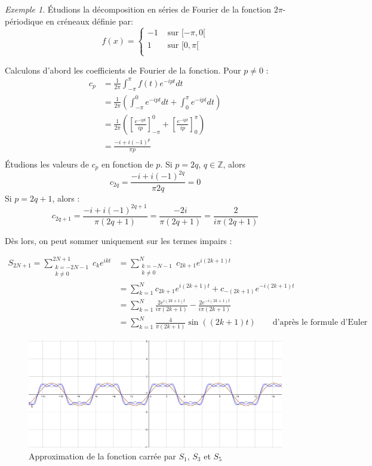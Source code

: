 \documentclass[]{article}
\theoremstyle{remark}
\newtheorem{myexmpl}{Exemple}
\theoremstyle{definition}
\begin{document}
	\begin{myexmpl}
		Étudions la décomposition en séries de Fourier de la fonction $2\pi$-périodique en créneaux définie par: 
		$$ f(x) = \left\{
		\begin{array}{cc}
			-1 & \text{ sur }[-\pi, 0[ \\
			1 & \text{ sur }[0, \pi[ \\
		\end{array}
		\right. $$
	
	Calculons d'abord les coefficients de Fourier de la fonction. 
	Pour $p \neq 0$ : 
	\begin{align*}
	c_p &= \frac{1}{2\pi} \int_{-\pi}^{\pi}f(t)e^{-ipt}dt\\
		&= \frac{1}{2\pi} \left(\int_{-\pi}^{0}e^{-ipt}dt + \int_{0}^{\pi}e^{-i pt}dt\right) \\
		&= \frac{1}{2\pi} \left( \left[\frac{e^{-ipt}}{ip}\right]_{-\pi}^{0}  + \left[\frac{e^{-ipt}}{ip}\right] _{0}^{\pi}  \right)\\
		&=\frac{ -i+i(-1)^p}{\pi p}\\
	\end{align*}
	Étudions les valeurs de $c_p$ en fonction de $p$. Si $p = 2q$, $q \in \mathbb{Z}$, alors 
	$$	c_{2q}= \frac{-i + i(-1)^{2q}}{\pi 2q }= 0 $$
	Si $ p = 2q+1$, alors :
	$$ c_{2q+1} = \frac{-i + i(-1)^{2q+1}}{\pi (2q+1) } = \frac{-2i}{\pi(2q+1)} = \frac{2}{i\pi(2q+1)} $$
	
	Dès lors, on peut sommer uniquement sur les termes impairs : 
	
	\begin{align*}
	S_{2N+1} = \sum_{ \substack{ k = -2N-1\\ k\neq 0} }^{2N+1}c_k e^{ikt} &=   \sum_{\substack{k = -N-1\\k\neq 0}}^{N}c_{2k+1} e^{i(2k+1)t} \\
	&= \sum_{k=1}^{N} c_{2k+1} e^{i(2k+1)t} + c_{-(2k+1)} e^{-i(2k+1)t} \\
	&= \sum_{k=1}^{N} \frac{2e^{i(2k+1)t}}{i\pi (2k+1)} - \frac{2e^{-i(2k+1)t}}{i\pi (2k+1)} \\
	&= \sum_{k=1}^{N} \frac{4}{\pi (2k+1)} \sin((2k+1)t)  \qquad\text{d'après le formule d'Euler}
	\end{align*}
	
	\begin{figure}[h]
		\centering
		\includegraphics[width=350pt]{Signal_carre_fourier.png}
		\caption{Approximation de la fonction carrée par $S_1$, $S_3$ et $S_5$}
	\end{figure}
	
	\end{myexmpl}
	
\end{document}
